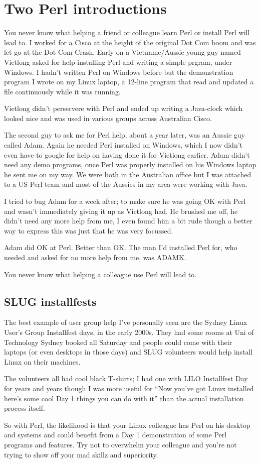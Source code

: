 \documentclass{article}      %
\begin{document}
\section{Two Perl introductions}

You never know what helping a friend or colleague learn Perl or
install Perl will lead to. I worked for a Cisco at the height of the
original Dot Com boom and was let go at the Dot Com Crash. Early on a
Vietname/Aussie young guy named Vietlong asked for help installing
Perl and writing a simple prgram, under Windows. I hadn't written Perl
on Windows before but the demonstration program I wrote on my Linux
laptop, a 12-line program that read and updated a file continuously
while it was running.

Vietlong didn't perservere with Perl and ended up writing a Java-clock
which looked nice and was used in various groups across Australian
Cisco.

The second guy to ask me for Perl help, about a year later, was an
Aussie guy called Adam. Again he needed Perl installed on Windows,
which I now didn't even have to google for help on having done it for
Vietlong earlier. Adam didn't need any demo programs, once Perl was
properly installed on his Windows laptop he sent me on my way. We were
both in the Australian office but I was attached to a US Perl team and
most of the Aussies in my area were working with Java.

I tried to bug Adam for a week after; to make sure he was going OK
with Perl and wasn't immediately giving it up as Vietlong had. He
brushed me off, he didn't need any more help from me, I even found him
a bit rude though a better way to express this was just that he was
very focussed.

Adam did OK at Perl. Better than OK. The man I'd installed Perl for,
who needed and asked for no more help from me, was ADAMK.

You never know what helping a colleague use Perl will lead to.

\subsection{SLUG installfests}

The best example of user group help I've personally seen are the
Sydney Linux User's Group Installfest days, in the early 2000s. They
had some rooms at Uni of Technology Sydney booked all Saturday and
people could come with their laptops (or even desktops in those days)
and SLUG volunteers would help install Linux on their machines.

The volunteers all had cool black T-shirts; I had one with LILO
Installfest Day for years and years though I was more useful for ``Now
you've got Linux installed here's some cool Day 1 things you can do
with it'' than the actual installation process itself.

So with Perl, the likelihood is that your Linux colleague has Perl on
his desktop and systems and could benefit from a Day 1 demonstration
of some Perl programs and features. Try not to overwhelm your
colleague and you're not trying to show off your mad skillz and
superiority.
\end{document}
